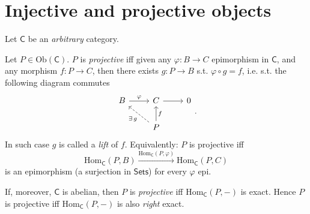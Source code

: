 \section{Injective and projective objects}
Let $\mathsf{C}$ be an {\em arbitrary} category.

\begin{defn}
	Let $P \in \mathrm{Ob} \left(\mathsf{C}\right)$.
	$P$ is {\em projective} iff given any $\varphi: B \to C$ epimorphism in $\mathsf{C}$, 
	and any morphism $f: P \to C$, then there exists $g: P \to B$ s.t. $\varphi \circ g = f$, 
	i.e. s.t. the following diagram commutes
	\begin{equation}
	\begin{tikzcd}
		B \arrow[r, "\varphi", rightarrow] &
		C \arrow[r, "", rightarrow] &
		0 \\
		&
		P \arrow[lu, "\exists\, g", dashrightarrow] \arrow[u, "f"', rightarrow]  &
	\end{tikzcd}
	.\end{equation} 
	In such case $g$ is called a {\em lift} of $f$.\newline
	Equivalently:
	$P$ is projective iff
	\begin{equation}
	\mathrm{Hom}_{\mathsf{C}} \left( P, B \right) \xrightarrow{\mathrm{Hom}_{\mathsf{C}} \left( P, \varphi \right)} 
	\mathrm{Hom}_{\mathsf{C}} \left( P, C \right)
	\end{equation} 
	is an epimorphism (a surjection in $\mathsf{Sets}$) for every $\varphi$ epi.
\end{defn}

\begin{rem}
	If, moreover, $\mathsf{C}$ is abelian, then
	$P$ is {\em projective} iff $\mathrm{Hom}_{\mathsf{C}} \left( P, - \right)$ is exact.
	Hence $P$ is projective iff $\mathrm{Hom}_{\mathsf{C}} \left( P, -\right)$ is also {\em right} exact.
\end{rem}

